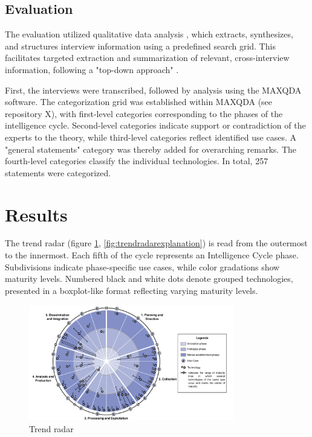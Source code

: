 \documentclass[10pt]{article}
\begin{document}
\subsection{Evaluation}

The evaluation utilized qualitative data analysis \cite{Glaser.2009}, which extracts, synthesizes, and structures interview information using a predefined search grid. This facilitates targeted extraction and summarization of relevant, cross-interview information, following a "top-down approach" \cite{Bogner.2014, Glaser.2009}.

First, the interviews were transcribed, followed by analysis using the MAXQDA software. The categorization grid was established within MAXQDA (see repository X), with first-level categories corresponding to the phases of the intelligence cycle. Second-level categories indicate support or contradiction of the experts to the theory, while third-level categories reflect identified use cases. A "general statements" category was thereby added for overarching remarks. The fourth-level categories classify the individual technologies. In total, 257 statements were categorized.

\section{Results} \label{sec:results}

The trend radar (figure \ref{fig:trendradar}, \ref{fig:trendradarexplanation}) is read from the outermost to the innermost.
Each fifth of the cycle represents an Intelligence Cycle phase. Subdivisions indicate
phase-specific use cases, while color gradations show maturity levels. Numbered black
and white dots denote grouped technologies, presented in a boxplot-like format reflecting
varying maturity levels.

\begin{figure}[thb]
    \centering
    \includegraphics[width=0.8\textwidth]{PDF/images/crop_Trendradar}
    \caption{Trend radar}
    \label{fig:trendradar}
\end{figure}
\end{document}
